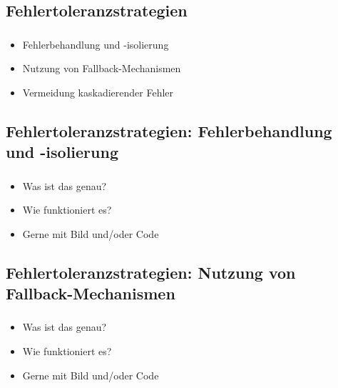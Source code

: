 \subsection{\textbf{Fehlertoleranzstrategien}}

\begin{frame}
    \frametitle{\insertsection}
    \framesubtitle{\insertsubsection}

    \begin{itemize}
        \item Fehlerbehandlung und -isolierung
        \item Nutzung von Fallback-Mechanismen
        \item Vermeidung kaskadierender Fehler
    \end{itemize}
\end{frame}

\subsection{Fehlertoleranzstrategien: Fehlerbehandlung und -isolierung}
\begin{frame}
    \frametitle{\insertsection}
    \framesubtitle{\insertsubsection}

    \begin{itemize}
        \item Was ist das genau?
        \item Wie funktioniert es?
        \item Gerne mit Bild und/oder Code
    \end{itemize}
\end{frame}

\subsection{Fehlertoleranzstrategien: Nutzung von Fallback-Mechanismen}
\begin{frame}
    \frametitle{\insertsection}
    \framesubtitle{\insertsubsection}

    \begin{itemize}
        \item Was ist das genau?
        \item Wie funktioniert es?
        \item Gerne mit Bild und/oder Code
    \end{itemize}
\end{frame}

